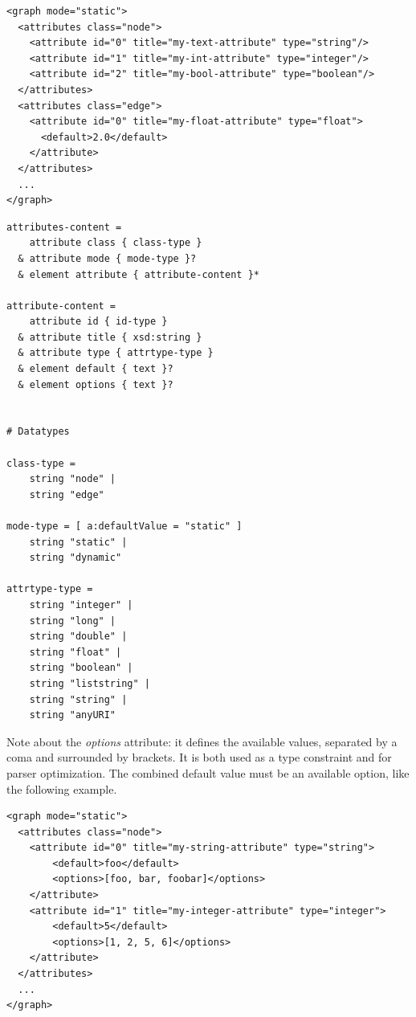 \documentclass[a4paper,10pt]{article}
\begin{document}
\lstset{ style=gexf }
\begin{lstlisting}[caption={Attributes Definition},label=attributesDef]
<graph mode="static">
  <attributes class="node">
    <attribute id="0" title="my-text-attribute" type="string"/>
    <attribute id="1" title="my-int-attribute" type="integer"/>
    <attribute id="2" title="my-bool-attribute" type="boolean"/>
  </attributes>
  <attributes class="edge">
    <attribute id="0" title="my-float-attribute" type="float">
      <default>2.0</default>
    </attribute>
  </attributes>
  ...
</graph>
\end{lstlisting}

\lstset{ style=rnc }
\begin{lstlisting}[caption={Attributes Specification},label=attributesRNC]
attributes-content =
    attribute class { class-type }
  & attribute mode { mode-type }?
  & element attribute { attribute-content }*

attribute-content =
    attribute id { id-type }
  & attribute title { xsd:string }
  & attribute type { attrtype-type }
  & element default { text }?
  & element options { text }?


# Datatypes

class-type =
    string "node" |
    string "edge"

mode-type = [ a:defaultValue = "static" ]
    string "static" |
    string "dynamic"

attrtype-type =
    string "integer" |
    string "long" |
    string "double" |
    string "float" |
    string "boolean" |
    string "liststring" |
    string "string" |
    string "anyURI"
\end{lstlisting}

Note about the \textit{options} attribute: it defines the available values, separated by a coma and surrounded by brackets. It is both used as a type constraint and for parser optimization. The combined default value must be an available option, like the following example.

\lstset{ style=gexf }
\begin{lstlisting}[caption={Options},label=optionsDef]
<graph mode="static">
  <attributes class="node">
    <attribute id="0" title="my-string-attribute" type="string">
        <default>foo</default>
        <options>[foo, bar, foobar]</options>
    </attribute>
    <attribute id="1" title="my-integer-attribute" type="integer">
        <default>5</default>
        <options>[1, 2, 5, 6]</options>
    </attribute>
  </attributes>
  ...
</graph>
\end{lstlisting}
\end{document}
